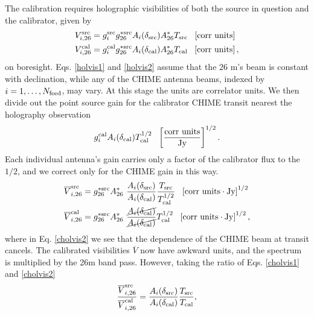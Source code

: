 The calibration requires holographic visibilities of both the source in question and the calibrator, given by\begin{subequations}
\begin{align}
V^{\rm src}_{i,{\rm 26}} &= g^{\rm src}_i g^{*{\rm src}}_{\rm 26} A_i(\delta_{\rm src}) A^*_{\rm 26} T_{\rm src} ~~ \left[ {\rm corr~units} \right] \label{holvis1}
\\ 
V^{\rm cal}_{i,{\rm 26}} &= g^{\rm cal}_i g^{*{\rm src}}_{\rm 26} A_i(\delta_{\rm cal}) A^*_{\rm 26} T_{\rm cal} ~~  \left[ {\rm corr~units} \right], \label{holvis2}
\end{align}
\end{subequations}
on boresight. Eqs. \ref{holvis1} and \ref{holvis2} assume that the 26 m's beam is constant with declination, while any of the CHIME antenna beams, indexed by $i=1,\dots,N_{\rm feed}$, may vary. At this stage the units are correlator units. We then divide out the point source gain for the calibrator CHIME transit nearest the holography observation 
\begin{align}
g^{\rm cal}_i A_i(\delta_{\rm cal}) T^{1/2}_{\rm cal} ~~  \left[ \frac{\rm corr~units}{\rm Jy} \right]^{1/2}.
\end{align}
Each individual antenna's gain carries only a factor of the calibrator flux to the $1/2$, and we correct only for the CHIME gain in this way.
\begin{subequations}
\begin{align}
\overline{V}^{\rm src}_{i,{\rm 26}} &= g^{*{\rm src}}_{\rm 26}A^*_{\rm 26}~\frac{A_i(\delta_{\rm src})}{A_i(\delta_{\rm cal})}  \frac{T_{\rm src}}{T_{\rm cal}^{1/2}} ~~ \left[ {\rm corr~units \cdot Jy} \right]^{1/2} \label{cholvis1}
\\ 
\overline{V}^{\rm cal}_{i,{\rm 26}} &=  g^{*{\rm src}}_{\rm 26} A^*_{\rm 26}~\frac{\cancel{A_i(\delta_{\rm cal})}}{\cancel{A_i(\delta_{\rm cal})}} T_{\rm cal}^{1/2} ~~  \left[ {\rm corr~units \cdot Jy} \right]^{1/2},  \label{cholvis2}
\end{align}
\end{subequations}
where in Eq. \ref{cholvis2} we see that the dependence of the CHIME beam at transit cancels. The calibrated visibilities $\overline{V}$ now have awkward units, and the spectrum is multiplied by the 26m band pass. However, taking the ratio of Eqs. \ref{cholvis1} and \ref{cholvis2}
\begin{align}
\frac{\overline{V}^{\rm src}_{i,{\rm 26}}}{\overline{V}^{\rm cal}_{i,{\rm 26}}} = \frac{A_i(\delta_{\rm src})}{A_i(\delta_{\rm cal})} \frac{T_{\rm src}}{T_{\rm cal}},
\end{align}

